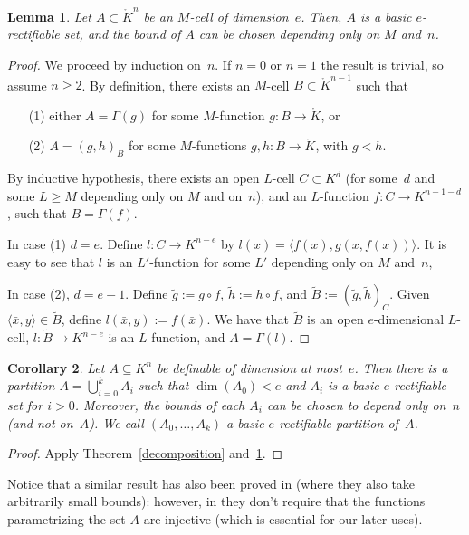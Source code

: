 \documentclass[a4paper, 12pt, final]{article}
\newtheorem{lem}{Lemma}[section]
\newtheorem{cor}[lem]{Corollary}
\newtheorem{open problem}[lem]{Open problem}
\theoremstyle{remark}
\theoremstyle{definition}
\newtheorem{final remark}[lem]{Final remark}
\begin{document}
\begin{lem}\label{lem:rectifiable-cell}
Let $A \subset {\mathring {K}}^n$ be an $M$-cell of dimension~$e$.
Then, $A$ is a {basic $e$-rectifiable\xspace} set, and the bound of $A$ can be chosen 
depending only on $M$ and~$n$.
\end{lem}
\begin{proof}
We proceed by induction on~$n$.
If $n = 0$ or $n = 1$ the result is trivial, so assume $n \geq 2$.
By definition, there exists an  $M$-cell $B \subset {\mathring {K}}^{n-1}$ such that 
\begin{enumerate}
\item[(1)] either $A = \Gamma(g)$ for some $M$-function $g: B \to {\mathring {K}}$, or
\item[(2)] $A = (g, h)_B$ for some $M$-functions $g, h: B \to {\mathring {K}}$, with $g < h$.
\end{enumerate}
By inductive hypothesis, there exists an open  $L$-cell $C \subset {K}^d$ (for some~$d$ and some
$L\geq M$ depending only on $M$ and on~$n$), and an $L$-function
$f: C \to {K}^{n-1-d}$, such that $B = \Gamma(f)$.

In case (1) $d=e$. Define $l : C \to {K}^{n-e}$ by $l(x)={\langle {f(x),g(x,f(x))} \rangle}$. It is easy to see that
$l$ is an $L'$-function for some $L'$ depending only on $M$ and~$n$, 

In case (2), $d=e-1$. Define $\tilde g :=  g \circ f$, $\tilde h:= h \circ f$, and
$\tilde B := (\tilde g, \tilde h)_{C}$.
Given ${\langle {{\bar x}, y} \rangle} \in \tilde B$, define $l({\bar x}, y) := f({\bar x})$.
We have that $\tilde B$ is an open $e$-dimensional $L$-cell, $l: \tilde B \to {K}^{n - e}$ is an
$L$-function, and $A = \Gamma(l)$.
\end{proof}

\begin{cor}\label{cor:partition}
Let $A \subseteq {K}^n$ be definable of dimension at most~$e$. 
Then there is a partition $A={\textstyle\bigcup}_{i=0}^kA_i$  such that $\dim(A_0)<e$ and
$A_i$ is a {basic $e$-rectifiable\xspace} set for $i>0$.
Moreover, the bounds of each $A_i$ can be  chosen to depend only on~$n$ (and
not on~$A$).
We call $(A_0, \dotsc, A_k)$ a {basic $e$-rectifiable\xspace} partition  of~$A$.
\end{cor}
\begin{proof}
Apply Theorem~\ref{decomposition} and~\ref{lem:rectifiable-cell}.
\end{proof}

Notice that a similar result has also been proved in \cite[Theorem~2.3]{PW} (where they also take arbitrarily small bounds): 
however, in \cite{PW} they don't require that the 
functions parametrizing the set $A$ are injective (which is essential for our
later uses).
\end{document}
